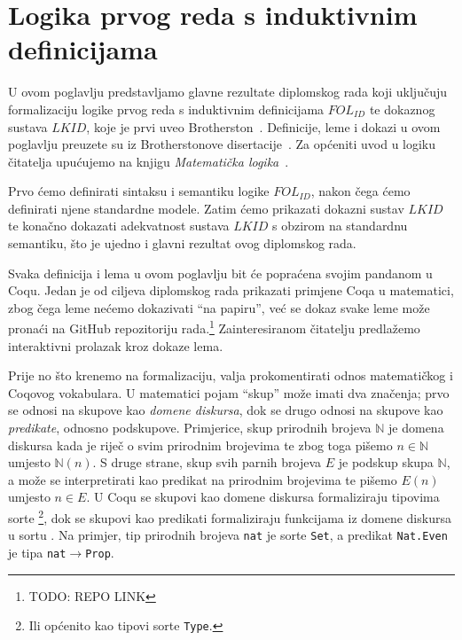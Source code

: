 \chapter{Logika prvog reda s induktivnim definicijama}\label{cha:logika-prvog-reda}
U ovom poglavlju predstavljamo glavne rezultate diplomskog rada koji uključuju formalizaciju
logike prvog reda s induktivnim definicijama \(\mathit{FOL_{ID}}\)
te dokaznog sustava \(\mathit{LKID}\), koje je prvi uveo Brotherston~\cite{brotherston2005}.
Definicije, leme i dokazi u ovom poglavlju preuzete su iz Brotherstonove disertacije~\cite{brotherstonphd}.
Za općeniti uvod u logiku čitatelja upućujemo na knjigu \textit{Matematička logika}~\cite{vukovic}.

Prvo ćemo definirati sintaksu i semantiku logike \(\mathit{FOL_{ID}}\),
nakon čega ćemo definirati njene standardne modele.
Zatim ćemo prikazati dokazni sustav \(\mathit{LKID}\) te konačno dokazati adekvatnost
sustava \(LKID\) s obzirom na standardnu semantiku,
što je ujedno i glavni rezultat ovog diplomskog rada.

Svaka definicija i lema u ovom poglavlju bit će popraćena svojim pandanom u Coqu.
Jedan je od ciljeva diplomskog rada prikazati primjene Coqa u matematici,
zbog čega leme nećemo dokazivati \enquote{na papiru},
već se dokaz svake leme može pronaći na GitHub repozitoriju rada.\footnote{TODO: REPO LINK}
Zainteresiranom čitatelju predlažemo interaktivni prolazak kroz dokaze lema.

Prije no što krenemo na formalizaciju, valja prokomentirati odnos matematičkog i Coqovog vokabulara.
U matematici pojam \enquote{skup} može imati dva značenja;
prvo se odnosi na skupove kao \textit{domene diskursa},
dok se drugo odnosi na skupove kao \textit{predikate}, odnosno podskupove.
Primjerice, skup prirodnih brojeva \(\mathbb{N}\) je domena diskursa kada je riječ o svim prirodnim brojevima
te zbog toga pišemo \(n \in \mathbb{N}\) umjesto \(\mathbb{N}(n)\).
S druge strane, skup svih parnih brojeva \(E\) je podskup skupa \(\mathbb{N}\), a može se interpretirati
kao predikat na prirodnim brojevima te pišemo \(E(n)\) umjesto \(n \in E\).
U Coqu se skupovi kao domene diskursa formaliziraju tipovima sorte \coqset\footnote{Ili općenito kao tipovi sorte \texttt{Type}.},
dok se skupovi kao predikati formaliziraju funkcijama iz domene diskursa u sortu \coqprop.
Na primjer, tip prirodnih brojeva \texttt{nat} je sorte \texttt{Set}, a predikat \texttt{Nat.Even} je tipa \texttt{nat\(\rightarrow\)Prop}.

